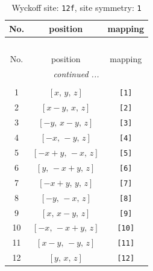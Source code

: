\documentclass[fleqn,8pt]{jsarticle}
\begin{document}
\begin{longtable}{ccc}
\caption{Wyckoff site: {\tt 12f}, site symmetry: {\tt 1}}
 \\
 \hline \hline
No. & position & mapping \\ \hline \endfirsthead

\multicolumn{2}{l}{\tablename\ \thetable{}} \\
 \hline \hline
No. & position & mapping \\ \hline \endhead

 \hline \hline
\multicolumn{2}{r}{\footnotesize\it continued ...} \\ \endfoot

 \hline \hline
\multicolumn{2}{r}{} \\ \endlastfoot

1 & $\left[ x,\, y,\, z \right]$ & {\tt [1]} \\ \hline
2 & $\left[ x - y,\, x,\, z \right]$ & {\tt [2]} \\ \hline
3 & $\left[ - y,\, x - y,\, z \right]$ & {\tt [3]} \\ \hline
4 & $\left[ - x,\, - y,\, z \right]$ & {\tt [4]} \\ \hline
5 & $\left[ - x + y,\, - x,\, z \right]$ & {\tt [5]} \\ \hline
6 & $\left[ y,\, - x + y,\, z \right]$ & {\tt [6]} \\ \hline
7 & $\left[ - x + y,\, y,\, z \right]$ & {\tt [7]} \\ \hline
8 & $\left[ - y,\, - x,\, z \right]$ & {\tt [8]} \\ \hline
9 & $\left[ x,\, x - y,\, z \right]$ & {\tt [9]} \\ \hline
10 & $\left[ - x,\, - x + y,\, z \right]$ & {\tt [10]} \\ \hline
11 & $\left[ x - y,\, - y,\, z \right]$ & {\tt [11]} \\ \hline
12 & $\left[ y,\, x,\, z \right]$ & {\tt [12]} \\
\end{longtable}
\end{document}
